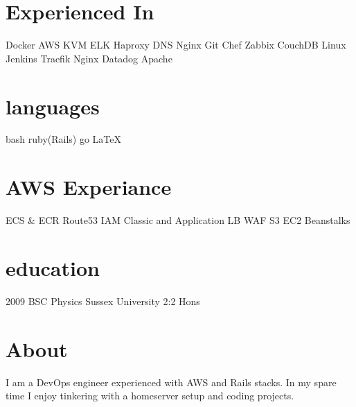 \documentclass[]{friggeri-cv-a4}
\begin{document}

\begin{aside}
	\section{Experienced In}
    Docker
    AWS
    KVM
    ELK
    Haproxy
    DNS
    Nginx
    Git
    Chef
    Zabbix
    CouchDB
		Linux
		Jenkins
    Traefik
    Nginx
    Datadog
    Apache
  \section{languages}
    bash
		ruby(Rails)
    go
    \LaTeX
  \section{AWS Experiance}
    ECS \& ECR
    Route53
    IAM
    Classic and Application LB
    WAF
    S3
    EC2
    Beanstalks
  \section{education}
    2009 BSC Physics Sussex University 2:2 Hons
\end{aside}

\section{About}
I am a DevOps engineer experienced with AWS and Rails stacks.  
In my spare time I enjoy tinkering with a homeserver setup and coding projects.
\end{document}
